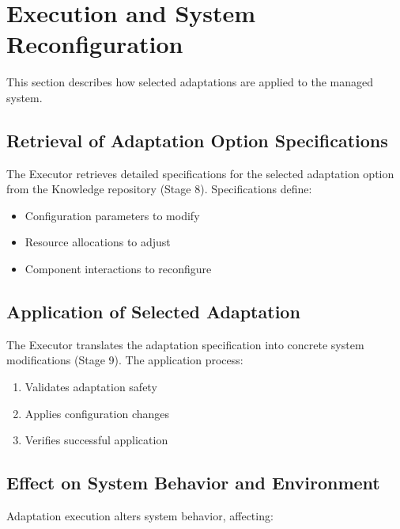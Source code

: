 \documentclass[11pt,a4paper]{article}
\begin{document}

\section{Execution and System Reconfiguration}
\label{sec:execution}

This section describes how selected adaptations are applied to the managed system.

\subsection{Retrieval of Adaptation Option Specifications}

The Executor retrieves detailed specifications for the selected adaptation option from the Knowledge repository (Stage 8). Specifications define:

\begin{itemize}
    \item Configuration parameters to modify
    \item Resource allocations to adjust
    \item Component interactions to reconfigure
\end{itemize}

\subsection{Application of Selected Adaptation}

The Executor translates the adaptation specification into concrete system modifications (Stage 9). The application process:

\begin{enumerate}
    \item Validates adaptation safety
    \item Applies configuration changes
    \item Verifies successful application
\end{enumerate}

\subsection{Effect on System Behavior and Environment}

Adaptation execution alters system behavior, affecting:
\end{document}
